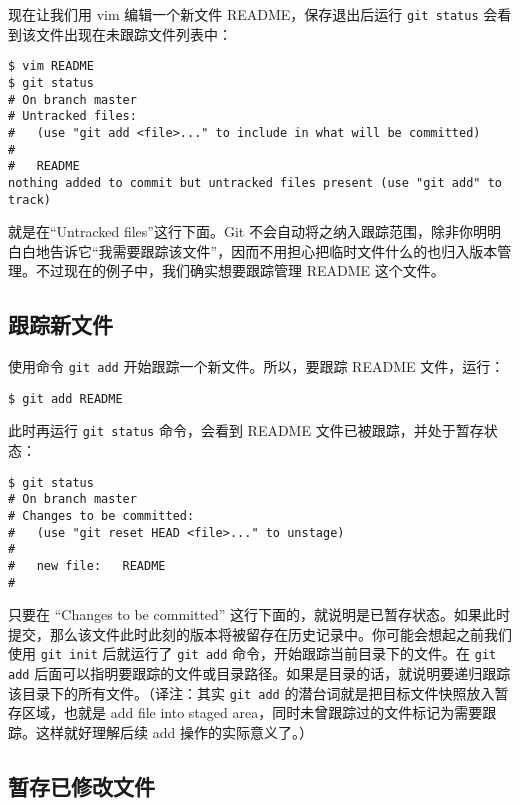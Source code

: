 \documentclass[a4paper]{book}
\begin{document}
现在让我们用 vim 编辑一个新文件 README，保存退出后运行 \texttt{git status} 会看到该文件出现在未跟踪文件列表中：

\begin{shaded}\begin{verbatim}
$ vim README
$ git status
# On branch master
# Untracked files:
#   (use "git add <file>..." to include in what will be committed)
#
#	README
nothing added to commit but untracked files present (use "git add" to track)
\end{verbatim}\end{shaded}

就是在“Untracked files”这行下面。Git 不会自动将之纳入跟踪范围，除非你明明白白地告诉它“我需要跟踪该文件”，因而不用担心把临时文件什么的也归入版本管理。不过现在的例子中，我们确实想要跟踪管理 README 这个文件。

\subsection{跟踪新文件}

使用命令 \texttt{git add} 开始跟踪一个新文件。所以，要跟踪 README 文件，运行：

\begin{shaded}\begin{verbatim}
$ git add README
\end{verbatim}\end{shaded}

此时再运行 \texttt{git status} 命令，会看到 README 文件已被跟踪，并处于暂存状态：

\begin{shaded}\begin{verbatim}
$ git status
# On branch master
# Changes to be committed:
#   (use "git reset HEAD <file>..." to unstage)
#
#	new file:   README
#
\end{verbatim}\end{shaded}

只要在 “Changes to be committed” 这行下面的，就说明是已暂存状态。如果此时提交，那么该文件此时此刻的版本将被留存在历史记录中。你可能会想起之前我们使用 \texttt{git init} 后就运行了 \texttt{git add} 命令，开始跟踪当前目录下的文件。在 \texttt{git add} 后面可以指明要跟踪的文件或目录路径。如果是目录的话，就说明要递归跟踪该目录下的所有文件。（译注：其实 \texttt{git add} 的潜台词就是把目标文件快照放入暂存区域，也就是 add file into staged area，同时未曾跟踪过的文件标记为需要跟踪。这样就好理解后续 add 操作的实际意义了。）

\subsection{暂存已修改文件}
\end{document}
